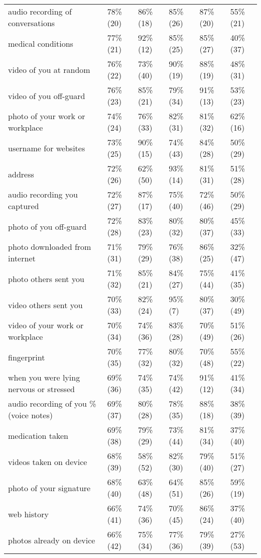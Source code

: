 \documentclass[a4paper,12pt]{article}
\begin{document}
\begin{longtable}{| p{7cm} | l | l | l | l | l |}
audio recording of conversations & 78\% (20) & 86\% (18) & 85\% (26) & 87\% (20) & 55\% (21) \\ 
medical conditions & 77\% (21) & 92\% (12) & 85\% (25) & 85\% (27) & 40\% (37) \\ 
video of you at random & 76\% (22) & 73\% (40) & 90\% (19) & 88\% (19) & 48\% (31) \\ 
video of you off-guard & 76\% (23) & 85\% (21) & 79\% (34) & 91\% (13) & 53\% (23) \\ 
photo of your work or workplace & 74\% (24) & 76\% (33) & 82\% (31) & 81\% (32) & 62\% (16) \\ 
username for websites & 73\% (25) & 90\% (15) & 74\% (43) & 84\% (28) & 50\% (29) \\ 
address & 72\% (26) & 62\% (50) & 93\% (14) & 81\% (31) & 51\% (28) \\ 
audio recording you captured & 72\% (27) & 87\% (17) & 75\% (40) & 72\% (46) & 50\% (29) \\ 
photo of you off-guard & 72\% (28) & 83\% (23) & 80\% (32) & 80\% (37) & 45\% (33) \\ 
photo downloaded from internet & 71\% (31) & 79\% (29) & 76\% (38) & 86\% (25) & 32\% (47) \\ 
photo others sent you & 71\% (32) & 85\% (21) & 84\% (27) & 75\% (44) & 41\% (35) \\ 
video others sent you & 70\% (33) & 82\% (24) & 95\% (7) & 80\% (37) & 30\% (49) \\ 
video of your work or workplace & 70\% (34) & 74\% (36) & 83\% (28) & 70\% (49) & 51\% (26) \\ 
fingerprint & 70\% (35) & 77\% (32) & 80\% (32) & 70\% (48) & 55\% (22) \\ 
when you were lying nervous or stressed & 69\% (36) & 74\% (35) & 74\% (42) & 91\% (12) & 41\% (34) \\ 
audio recording of you \% (voice notes) & 69\% (37) & 80\% (28) & 78\% (35) & 88\% (18) & 38\% (39) \\ 
medication taken & 69\% (38) & 79\% (29) & 73\% (44) & 81\% (34) & 37\% (40) \\ 
videos taken on device & 68\% (39) & 58\% (52) & 82\% (30) & 79\% (40) & 51\% (27) \\ 
photo of your signature & 68\% (40) & 63\% (48) & 64\% (51) & 85\% (26) & 59\% (19) \\ 
web history & 66\% (41) & 74\% (36) & 70\% (45) & 86\% (24) & 37\% (40) \\ 
photos already on device & 66\% (42) & 75\% (34) & 77\% (36) & 79\% (39) & 27\% (53) \\ 

\end{longtable}
\end{document}

